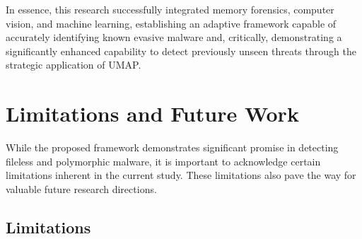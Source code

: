 In essence, this research successfully integrated memory forensics, computer vision, and machine learning, establishing an adaptive framework capable of accurately identifying known evasive malware and, critically, demonstrating a significantly enhanced capability to detect previously unseen threats through the strategic application of UMAP.

\section{Limitations and Future Work}
\label{sec:limitations_future}

While the proposed framework demonstrates significant promise in detecting fileless and polymorphic malware, it is important to acknowledge certain limitations inherent in the current study. These limitations also pave the way for valuable future research directions.

\subsection{Limitations}
\label{subsec:limitations}

